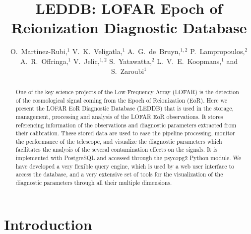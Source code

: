 
\resetcounters


\title{LEDDB: LOFAR Epoch of Reionization Diagnostic Database}
\author{O.~Martinez-Rubi,$^1$ V.~K.~Veligatla,$^1$ A.~G.~de~Bruyn,$^{1,2}$ P.~Lampropoulos,$^2$ A.~R.~Offringa,$^1$ V.~Jelic,$^{1,2}$ S.~Yatawatta,$^2$ L.~V.~E.~Koopmans,$^1$ and S.~Zaroubi$^1$
}


\begin{abstract}
One of the key science projects of the Low-Frequency Array (LOFAR) is the detection of the cosmological signal coming from the Epoch of Reionization (EoR). Here we present the LOFAR EoR Diagnostic Database (LEDDB) that is used in the storage, management, processing and analysis of the LOFAR EoR observations. It stores referencing information of the observations and diagnostic parameters extracted from their calibration. These stored data are used to ease the pipeline processing, monitor the performance of the telescope, and visualize the diagnostic parameters which facilitates the analysis of the several contamination effects on the signals. It is implemented with PostgreSQL and accessed through the psycopg2 Python module. We have developed a very flexible query engine, which is used by a web user interface to access the database, and a very extensive set of tools for the visualization of the diagnostic parameters through all their multiple dimensions.
\end{abstract}

\section{Introduction}

